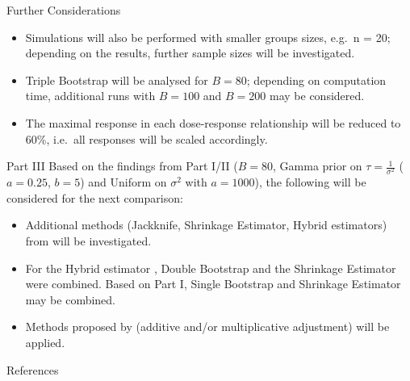 \documentclass[
  ignorenonframetext,
  aspectratio=169]{beamer}
\newif\ifbibliography
\providecommand{\tightlist}{%
  \setlength{\itemsep}{0pt}\setlength{\parskip}{0pt}}
\begin{document}
\begin{frame}{Further Considerations}
\label{further-considerations}
\begin{itemize}
\tightlist
\item
  Simulations will also be performed with smaller groups sizes, e.g.~n =
  20; depending on the results, further sample sizes will be
  investigated.
\item
  Triple Bootstrap will be analysed for \(B = 80\); depending on
  computation time, additional runs with \(B = 100\) and \(B = 200\) may
  be considered.
\item
  The maximal response in each dose-response relationship will be
  reduced to 60\%, i.e.~all responses will be scaled accordingly.
\end{itemize}
\end{frame}

\begin{frame}{Part III}
\label{part-iii}
Based on the findings from Part I/II (\(B = 80\), Gamma prior on
\(\tau = \frac{1}{\sigma^2}\) (\(a = 0.25\), \(b = 5\)) and Uniform on
\(\sigma^2\) with \(a = 1000\)), the following will be considered for
the next comparison:

\begin{itemize}
\tightlist
\item
  Additional methods (Jackknife, Shrinkage Estimator, Hybrid estimators)
  from \citep{tianyu2024} will be investigated.
\item
  For the Hybrid estimator \citep{tianyu2024}, Double Bootstrap and the
  Shrinkage Estimator were combined. Based on Part I, Single Bootstrap
  and Shrinkage Estimator may be combined.
\item
  Methods proposed by \citep{Stein} (additive and/or multiplicative
  adjustment) will be applied.
\end{itemize}
\end{frame}

\renewcommand\refname{References}
\begin{frame}[allowframebreaks]{References}
  \bibliographytrue
  
\end{frame}
\end{document}
